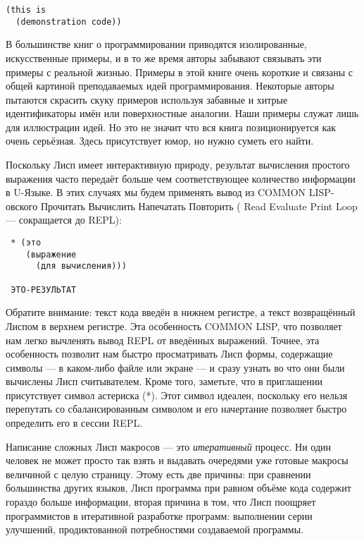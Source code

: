 \begin{verbatim}
(this is
  (demonstration code))
\end{verbatim}

В большинстве книг о программировании приводятся изолированные, искусственные примеры, и в то же время авторы забывают связывать эти примеры с реальной жизнью. Примеры в этой книге очень короткие и связаны с общей картиной преподаваемых идей программирования. Некоторые авторы пытаются скрасить скуку примеров используя забавные и хитрые идентификаторы имён или поверхностные аналогии. Наши примеры служат лишь для иллюстрации идей. Но это не значит что вся книга позиционируется как очень серьёзная. Здесь присутствует юмор, но нужно суметь его найти.

Поскольку Лисп имеет интерактивную природу, результат вычисления простого выражения часто передаёт больше чем соответствующее количество информации в U-Языке. В этих случаях мы будем применять вывод из COMMON LISP-овс\-кого Прочитать Вычислить Напечатать Повторить ( Read Evaluate Print Loop --- сокращается до REPL):

\begin{verbatim}
 * (это
    (выражение
      (для вычисления)))

 ЭТО-РЕЗУЛЬТАТ
\end{verbatim}

Обратите внимание: текст кода введён в нижнем регистре, а текст возвращённый Лиспом в верхнем регистре. Эта особенность COMMON LISP, что позволяет нам легко вычленять вывод REPL от введённых выражений. Точнее, эта особенность позволит нам быстро просматривать Лисп формы, содержащие символы --- в каком-либо файле или экране --- и сразу узнать во что они были вычислены Лисп считывателем. Кроме того, заметьте, что в приглашении присутствует символ астериска (*). Этот символ идеален, поскольку его нельзя перепутать со сбалансированным символом и его начертание позволяет быстро определить его в сессии REPL.

Написание сложных Лисп макросов --- это \emph{итеративный} процесс. Ни один человек не может просто так взять и выдавать очередями уже готовые макросы величиной с целую страницу. Этому есть две причины: при сравнении большинства других языков, Лисп программа при равном объёме кода содержит гораздо больше информации, вторая причина в том, что Лисп поощряет программистов в итеративной разработке программ: выполнении серии улучшений, продиктованной потребностями создаваемой программы.

